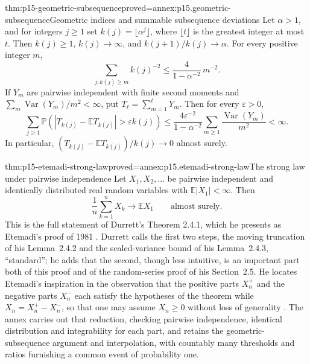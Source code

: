 \begin{hblemma}{thm:p15-geometric-subsequence}{proved=annex:p15.geometric-subsequence}{Geometric indices and summable subsequence deviations}
Let \(\alpha>1\), and for integers \(j\geq1\) set
\(k(j)=\lfloor\alpha^j\rfloor\), where \(\lfloor t\rfloor\)
is the greatest integer at most \(t\). Then \(k(j)\geq1\),
\(k(j)\to\infty\), and \(k(j+1)/k(j)\to\alpha\).
For every positive integer \(m\),
\[
 \sum_{j:k(j)\geq m}k(j)^{-2}
                     \leq\frac{4}{1-\alpha^{-2}}\,m^{-2}.
\]
If \(Y_m\) are pairwise independent with finite second moments and
\(\sum_m\operatorname{Var}(Y_m)/m^2<\infty\), put
\(T_\ell=\sum_{m=1}^\ell Y_m\). Then for every
\(\varepsilon>0\),
\[
 \sum_{j\geq1}
 \mathbb P\!\left(|T_{k(j)}-\mathbb ET_{k(j)}|>
                                       \varepsilon k(j)\right)
 \leq\frac{4\varepsilon^{-2}}{1-\alpha^{-2}}
           \sum_{m\geq1}\frac{\operatorname{Var}(Y_m)}{m^2}<\infty.
\]
In particular,
\((T_{k(j)}-\mathbb ET_{k(j)})/k(j)\to0\) almost surely.
\end{hblemma}

\begin{hbtheorem}{thm:p15-etemadi-strong-law}{proved=annex:p15.etemadi-strong-law}{The strong law under pairwise independence}
Let \(X_1,X_2,\ldots\) be pairwise independent and identically
distributed real random variables with \(\mathbb E|X_1|<\infty\).
Then
\[
 \frac1n\sum_{k=1}^nX_k\longrightarrow\mathbb EX_1
                                      \qquad\text{almost surely}.
\]
This is the full statement of Durrett's Theorem 2.4.1, which he
presents as Etemadi's proof of 1981 \cite[p.~76]{DurrettPTEAuthor2019}.
Durrett calls the first two steps, the moving truncation of his
Lemma~2.4.2 and the scaled-variance bound of his Lemma~2.4.3,
``standard''; he adds that the second, though less intuitive, is an
important part both of this proof and of the random-series proof of his
Section~2.5. He locates Etemadi's inspiration in the observation that
the positive parts \(X_n^+\) and the negative parts \(X_n^-\) each satisfy
the hypotheses of the theorem while \(X_n=X_n^+-X_n^-\), so that one may
assume \(X_n\geq0\) without loss of generality
\cite[pp.~76--77]{DurrettPTEAuthor2019}. The annex carries out that
reduction, checking pairwise independence, identical distribution and
integrability for each part, and retains the geometric-subsequence
argument and interpolation, with countably many thresholds and ratios
furnishing a common event of probability one.
\end{hbtheorem}

